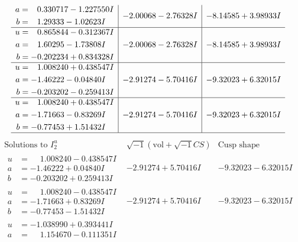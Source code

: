 \documentclass[1p]{elsarticle_modified}
\theoremstyle{definition}
\newcommand{\I}{\sqrt{-1}}
\begin{document}
$$\begin{array}{c|c|c}
\begin{aligned}
a &= \phantom{-}0.330717 - 1.227550 I \\
b &= \phantom{-}1.29333 - 1.02623 I\end{aligned}
 & -2.00068 - 2.76328 I & -8.14585 + 3.98933 I \\ \hline\begin{aligned}
u &= \phantom{-}0.865844 - 0.312367 I \\
a &= \phantom{-}1.60295 - 1.73808 I \\
b &= -0.202234 + 0.834328 I\end{aligned}
 & -2.00068 - 2.76328 I & -8.14585 + 3.98933 I \\ \hline\begin{aligned}
u &= \phantom{-}1.008240 + 0.438547 I \\
a &= -1.46222 - 0.04840 I \\
b &= -0.203202 - 0.259413 I\end{aligned}
 & -2.91274 - 5.70416 I & -9.32023 + 6.32015 I \\ \hline\begin{aligned}
u &= \phantom{-}1.008240 + 0.438547 I \\
a &= -1.71663 - 0.83269 I \\
b &= -0.77453 + 1.51432 I\end{aligned}
 & -2.91274 - 5.70416 I & -9.32023 + 6.32015 I\\
 \hline 
 \end{array}$$\newpage$$\begin{array}{c|c|c}  
\text{Solutions to }I^u_{2}& \I (\text{vol} + \sqrt{-1}CS) & \text{Cusp shape}\\
 \hline 
\begin{aligned}
u &= \phantom{-}1.008240 - 0.438547 I \\
a &= -1.46222 + 0.04840 I \\
b &= -0.203202 + 0.259413 I\end{aligned}
 & -2.91274 + 5.70416 I & -9.32023 - 6.32015 I \\ \hline\begin{aligned}
u &= \phantom{-}1.008240 - 0.438547 I \\
a &= -1.71663 + 0.83269 I \\
b &= -0.77453 - 1.51432 I\end{aligned}
 & -2.91274 + 5.70416 I & -9.32023 - 6.32015 I \\ \hline\begin{aligned}
u &= -1.038990 + 0.393441 I \\
a &= \phantom{-}1.154670 - 0.111351 I \\

\end{aligned}
\end{array}$$
\end{document}
